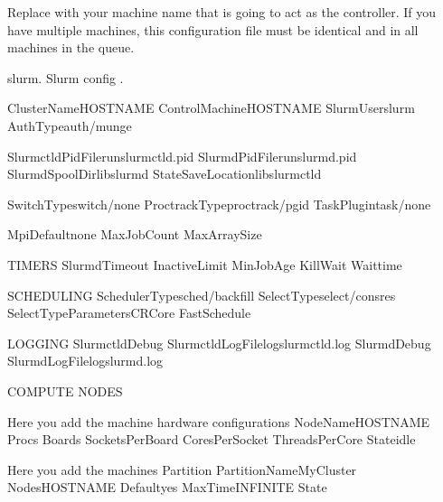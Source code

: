 \documentclass[letterpaper,10pt,english]{sphinxmanual}
\begin{document}
Replace  with your machine name that is going to act as the
controller. If you have multiple machines, this configuration file must be
identical and in all machines in the queue.

%
\begin{sphinxVerbatim}[commandchars=\\\{\}]
\PYGZsh{}\PYGZsh{}\PYGZsh{} slurm.  Slurm config .

\PYGZsh{}ClusterName\PYGZdl{}HOST\PYGZus{}NAME
ControlMachine\PYGZdl{}HOST\PYGZus{}NAME
SlurmUserslurm
AuthTypeauth/munge

SlurmctldPidFilerunslurmctld.pid
SlurmdPidFilerunslurmd.pid
SlurmdSpoolDirlibslurmd
StateSaveLocationlibslurmctld

SwitchTypeswitch/none
ProctrackTypeproctrack/pgid
TaskPlugintask/none

MpiDefaultnone
MaxJobCount
MaxArraySize

\PYGZsh{} TIMERS
SlurmdTimeout
InactiveLimit
MinJobAge
KillWait
Waittime

\PYGZsh{} SCHEDULING
SchedulerTypesched/backfill
SelectTypeselect/cons\PYGZus{}res
SelectTypeParametersCR\PYGZus{}Core
FastSchedule

\PYGZsh{} LOGGING
SlurmctldDebug
SlurmctldLogFilelogslurmctld.log
SlurmdDebug
SlurmdLogFilelogslurmd.log

\PYGZsh{} COMPUTE NODES

\PYGZsh{} Here you add the machine hardware configurations
NodeName\PYGZdl{}HOST\PYGZus{}NAME Procs Boards SocketsPerBoard CoresPerSocket ThreadsPerCore Stateidle

\PYGZsh{} Here you add the machines   Partition
PartitionNameMyCluster Nodes\PYGZdl{}HOST\PYGZus{}NAME Defaultyes MaxTimeINFINITE State
\end{sphinxVerbatim}
\end{document}
